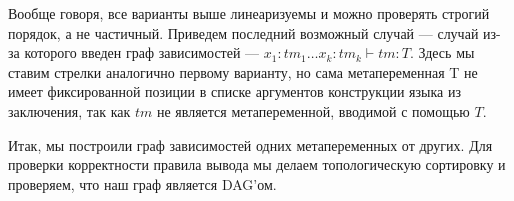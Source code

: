 Вообще говоря, все варианты выше линеаризуемы и можно проверять строгий порядок, а не частичный. Приведем последний возможный случай --- случай из-за которого введен граф зависимостей --- $x_1 : tm_1 \ldots x_k : tm_k  \vdash tm : T$. Здесь мы ставим стрелки аналогично первому варианту, но сама метапеременная T не имеет фиксированной позиции в списке аргументов конструкции языка из заключения, так как $tm$ не является метапеременной, вводимой с помощью $T$.

Итак, мы построили граф зависимостей одних метапеременных от других. Для проверки корректности правила вывода мы делаем топологическую сортировку и проверяем, что наш граф является DAG'ом.























